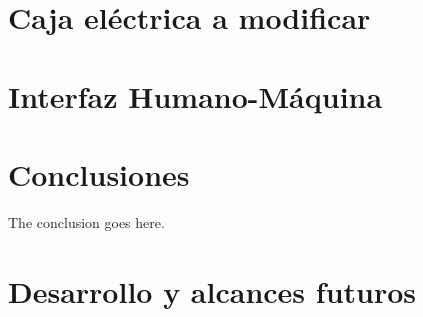 \documentclass[conference]{IEEEtran}
\begin{document}
\section{Caja eléctrica a modificar}


\section{Interfaz Humano-Máquina}
\label{sec:HMI}


\section{Conclusiones}
The conclusion goes here.


\section{Desarrollo y alcances futuros}


\section*{}

\end{document}
